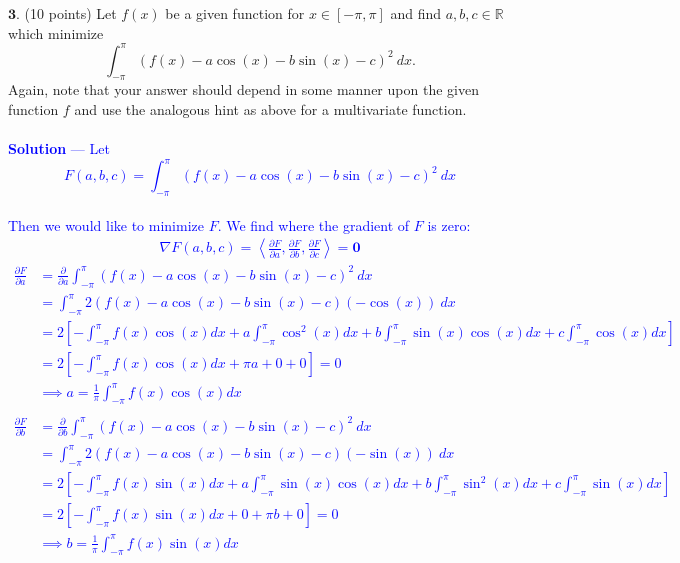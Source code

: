 \documentclass[12pt]{article}
\begin{document}
\noindent $\textbf{3}$. (10 points) Let $f(x)$ be a given function for $x \in [-\pi, \pi]$ and find $a, b, c \in \mathbb{R}$ which minimize
$$\int_{-\pi}^\pi \left ( f(x) - a\cos(x) - b\sin(x) - c \right )^2 \ dx.$$
Again, note that your answer should depend in some manner upon the given function $f$ and use the analogous hint as above for a multivariate function.\\ \\
\textcolor{blue}{\textbf{Solution} — Let $$F(a,b,c) = \int_{-\pi}^\pi \left ( f(x) - a\cos(x) - b\sin(x) - c \right )^2 \ dx$$ \\ Then we would like to minimize $F$. We find where the gradient of $F$ is zero: \\
\begin{align*}
\nabla F(a,b,c) = \left\langle \frac{\partial F}{\partial a}, \frac{\partial F}{\partial b}, \frac{\partial F}{\partial c} \right\rangle = \mathbf{0}
\end{align*}
\begin{align*}
\frac{\partial F}{\partial a} &= \frac{\partial}{\partial a} \int_{-\pi}^\pi \left ( f(x) - a\cos(x) - b\sin(x) - c \right )^2 \ dx \\
&= \int_{-\pi}^\pi  2( f(x) - a\cos(x) - b\sin(x) - c)(-\cos(x)) \ dx \\
&= 2 \left[-\int_{-\pi}^\pi  f(x)\cos(x) dx + a \int_{-\pi}^\pi  \cos^2(x) dx + b \int_{-\pi}^\pi  \sin(x)\cos(x) dx + c \int_{-\pi}^\pi  \cos(x) dx \right] \\
&= 2 \left[-\int_{-\pi}^\pi  f(x)\cos(x) dx + \pi a + 0 + 0 \right] = 0 \\
&\implies a = \frac{1}{\pi} \int_{-\pi}^\pi  f(x)\cos(x) dx  \\
\end{align*}
\begin{align*}
\frac{\partial F}{\partial b} &= \frac{\partial}{\partial b} \int_{-\pi}^\pi \left ( f(x) - a\cos(x) - b\sin(x) - c \right )^2 \ dx \\
&= \int_{-\pi}^\pi  2( f(x) - a\cos(x) - b\sin(x) - c)(-\sin(x)) \ dx \\
&= 2 \left[-\int_{-\pi}^\pi  f(x)\sin(x) dx + a \int_{-\pi}^\pi  \sin(x)\cos(x) dx + b \int_{-\pi}^\pi  \sin^2(x) dx + c \int_{-\pi}^\pi  \sin(x) dx \right] \\
&= 2 \left[-\int_{-\pi}^\pi  f(x)\sin(x) dx + 0 + \pi b + 0 \right] = 0 \\
&\implies b = \frac{1}{\pi} \int_{-\pi}^\pi  f(x)\sin(x) dx  \\
\end{align*}
}
\end{document}
